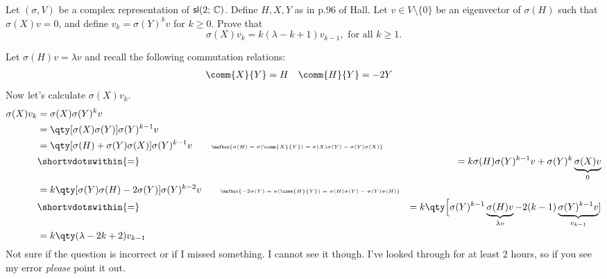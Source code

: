\documentclass[
	pages,
	boxes,
	color=WildStrawberry
]{homework}
\begin{document}
\begin{problem}
Let $(\sigma, V)$ be a complex representation of $\mathsf{sl}(2;\, \mathbb{C})$. Define $H, X, Y$ as in p.96 of Hall. Let $v \in V \setminus \{0\}$ be an eigenvector of $\sigma(H)$ such that $\sigma(X) v = 0$, and define $v_{k} = \sigma(Y)^k v$ for $k \geq 0$. Prove that
\[
	\sigma(X)v_k = k(\lambda - k + 1)v_{k-1}, \text{ for all } k \geq 1.
\]
\end{problem}

\begin{solution}
	Let $\sigma(H)v = \lambda v$ and recall the following commutation relations:
	\begin{align*}
		\comm{X}{Y} & = H & \comm{H}{Y} & = -2Y
	\end{align*}
	Now let's calculate $\sigma(X)v_k$.
	\begin{align*}
		\sigma(X)v_k & = \sigma(X)\sigma(Y)^k v                                                                                                                                     \\
		             & = \qty[\sigma(X)\sigma(Y)]\sigma(Y)^{k-1}v                                                                                                                   \\
		             & = \qty[\sigma(H) + \sigma(Y)\sigma(X)]\sigma(Y)^{k-1}v \tag*{\tiny $\mafbox{\sigma(H) = \sigma(\comm{X}{Y}) = \sigma(X)\sigma(Y) - \sigma(Y)\sigma(X)}$}     \\
		             & \shortvdotswithin{=}
		             & = k\sigma(H)\sigma(Y)^{k-1}v + \sigma(Y)^k \underbrace{\sigma(X)v}_{0}                                                                                       \\
		             & = k\qty[\sigma(Y)\sigma(H) - 2\sigma(Y)]\sigma(Y)^{k-2}v \tag*{\tiny $\mafbox{-2\sigma(Y) = \sigma(\comm{H}{Y}) = \sigma(H)\sigma(Y) - \sigma(Y)\sigma(H)}$} \\
		             & \shortvdotswithin{=}
		             & = k\qty\Big[\sigma(Y)^{k-1}\underbrace{\sigma(H)v}_{\lambda v} - 2(k-1)\underbrace{\sigma(Y)^{k-1}v}_{v_{k-1}}]                                              \\
		             & = k\qty(\lambda - 2k + 2)v_{k-1}
	\end{align*}
	Not sure if the question is incorrect or if I missed something. I cannot see it though. I've looked through for at least 2 hours, so if you see my error \emph{please} point it out.
\end{solution}
\end{document}
